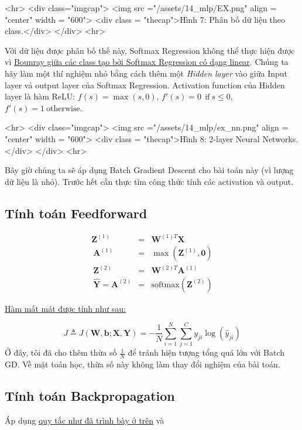  
 
<hr> 
<div class="imgcap"> 
 <img src ="/assets/14_mlp/EX.png" align = "center" width = "600"> 
 <div class = "thecap">Hình 7: Phân bố dữ liệu theo class.</div> 
</div> 
<hr> 
 
Với dữ liệu được phân bố thế này, Softmax Regression không thể thực hiện được vì \href{http://machinelearningcoban.com/2017/02/17/softmax/#-boundary-tao-boi-softmax-regression-la-linear}{Bounray giữa các class tạo bởi Softmax Regression có dạng linear}. Chúng ta hãy làm một thí nghiệm nhỏ bằng cách thêm một \textit{Hidden layer} vào giữa Input layer vả output layer của Softmax Regression. Activation function của Hidden layer là hàm ReLU: $f(s) = \max(s, 0)$, $f'(s) = 0 ~~\text{if}~ s \leq 0$, $f'(s) = 1 ~\text{otherwise}$. 
 
<hr> 
<div class="imgcap"> 
 <img src ="/assets/14_mlp/ex_nn.png" align = "center" width = "600"> 
 <div class = "thecap">Hình 8: 2-layer Neural Networks.</div> 
</div> 
<hr> 
 
Bây giờ chúng ta sẽ áp dụng Batch Gradient Descent cho bài toán này (vì lượng dữ liệu là nhỏ). Trước hết cần thực tìm công thức tính các activation và output. 
 
\subsection{Tính toán Feedforward}
\begin{eqnarray} 
\mathbf{Z}^{(1)} &=& \mathbf{W}^{(1)T}\mathbf{X} \\\ 
\mathbf{A}^{(1)} &=& \max(\mathbf{Z}^{(1)}, \mathbf{0}) \\\ 
\mathbf{Z}^{(2)} &=& \mathbf{W}^{(2)T}\mathbf{A}^{(1)} \\\ 
\mathbf{\hat{Y}} = \mathbf{A}^{(2)} &=& \text{softmax}(\mathbf{Z}^{(2)}) 
\end{eqnarray} 
 
\href{http://machinelearningcoban.com/2017/02/17/softmax/#-ham-mat-mat-cho-softmax-regression}{Hàm mất mát được tính như sau:} 
 
\begin{equation*} 
J \triangleq J(\mathbf{W, b}; \mathbf{X, Y}) = -\frac{1}{N}\sum_{i = 1}^N \sum_{j = 1}^C y_{ji}\log(\hat{y}_{ji}) 
\end{equation*} 
Ở đây, tôi đã cho thêm thừa số $\frac{1}{N}$ để tránh hiện tượng tổng quá lớn với Batch GD. Về mặt toán học, thừa số này không làm thay đổi nghiệm của bài toán. 
 
 
\subsection{Tính toán Backpropagation}
Áp dụng \href{http://machinelearningcoban.com#-backpropagation-cho-batch-mini-batch-gradient-descent}{quy tắc như đã trình bày ở trên} và 
 
